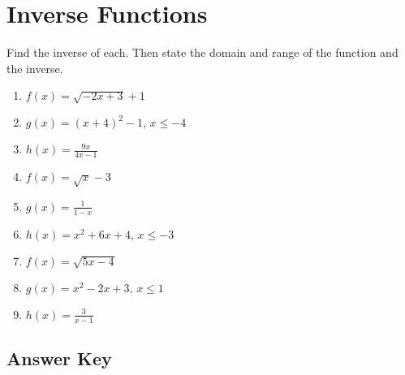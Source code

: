 \chapter{Inverse Functions}

Find the inverse of each. Then state the domain and range of the function and the inverse.

\begin{enumerate}
	\item $f(x) = \sqrt{-2x + 3} + 1$
	\item $g(x) = (x+4)^2 - 1, \, x \leq -4$
	\item $h(x) = \frac{9x}{4x-1}$
	\item $f(x) = \sqrt{x} - 3$
	\item $g(x) = \frac{1}{1-x}$
	\item $h(x) = x^2 + 6x + 4, \, x \leq -3$
	\item $f(x) = \sqrt{5x-4}$
	\item $g(x) = x^2 - 2x + 3, \, x \leq 1$
	\item $h(x) = \frac{3}{x-1}$
\end{enumerate}

\newpage

\section{Answer Key}

